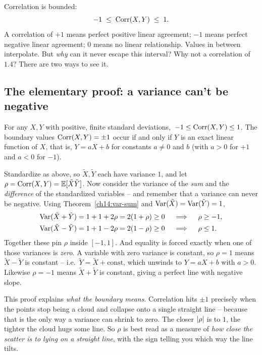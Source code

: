 Correlation is bounded:
\[
-1 \;\le\; \operatorname{Corr}(X, Y) \;\le\; 1.
\]
A correlation of $+1$ means perfect positive linear agreement; $-1$ means perfect
negative linear agreement; $0$ means no linear relationship. Values in between
interpolate. But \emph{why} can it never escape this interval? Why not a correlation
of $1.4$? There are two ways to see it.

\subsection{The elementary proof: a variance can't be negative}

\begin{theorem}
\label{ch14:corr-bound}
For any $X, Y$ with positive, finite standard deviations,
$\,-1 \le \operatorname{Corr}(X, Y) \le 1$. The boundary values $\operatorname{Corr}(X, Y) = \pm 1$ occur if
and only if $Y$ is an exact linear function of $X$, that is, $Y = aX + b$ for
constants $a \ne 0$ and $b$ (with $a > 0$ for $+1$ and $a < 0$ for $-1$).
\end{theorem}

\begin{whybox}
Standardize as above, so $\tilde X, \tilde Y$ each have variance $1$, and let
$\rho = \operatorname{Corr}(X,Y) = \operatorname{\mathbb{E}}[\tilde X \tilde Y]$. Now consider the variance of the
\emph{sum} and the \emph{difference} of the standardized variables -- and remember
that a variance can never be negative. Using
Theorem~\ref{ch14:var-sum} and $\operatorname{Var}(\tilde X) = \operatorname{Var}(\tilde Y) = 1$,
\begin{align*}
\operatorname{Var}(\tilde X + \tilde Y) &= 1 + 1 + 2\rho = 2(1 + \rho) \ge 0 \quad\implies\quad \rho \ge -1, \\
\operatorname{Var}(\tilde X - \tilde Y) &= 1 + 1 - 2\rho = 2(1 - \rho) \ge 0 \quad\implies\quad \rho \le 1.
\end{align*}
Together these pin $\rho$ inside $[-1, 1]$. And equality is forced exactly when one
of those variances is \emph{zero}. A variable with zero variance is constant, so
$\rho = 1$ means $\tilde X - \tilde Y$ is constant -- i.e.\ $\tilde Y = \tilde X +
\text{const}$, which unwinds to $Y = aX + b$ with $a > 0$. Likewise $\rho = -1$
means $\tilde X + \tilde Y$ is constant, giving a perfect line with negative slope.
\end{whybox}

\begin{happeningbox}
This proof explains \emph{what the boundary means}.
Correlation hits $\pm 1$ precisely when the points stop being a cloud and collapse
onto a single straight line -- because that is the only way a variance can shrink to
zero. The closer $\lvert\rho\rvert$ is to $1$, the tighter the cloud hugs some line. So
$\rho$ is best read as a measure of \emph{how close the scatter is to lying on a
straight line}, with the sign telling you which way the line tilts.
\end{happeningbox}

